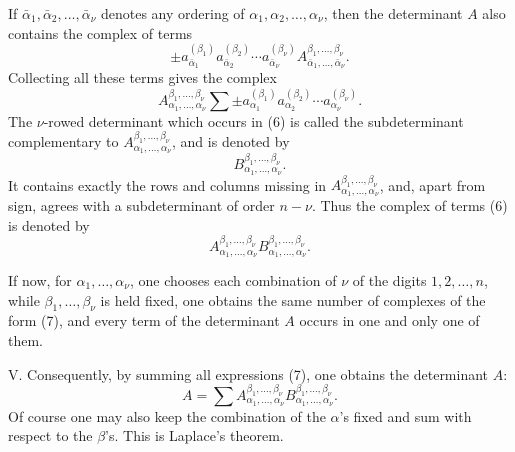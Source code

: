 \documentclass[11pt]{article}
\begin{document}
If \(\bar\alpha_1,\bar\alpha_2,\ldots,\bar\alpha_\nu\) denotes any ordering of \(\alpha_1,\alpha_2,\ldots,\alpha_\nu\), then the determinant \(A\) also contains the complex of terms
\[
        \pm a_{\bar\alpha_1}^{(\beta_1)}a_{\bar\alpha_2}^{(\beta_2)}\cdots
        a_{\bar\alpha_\nu}^{(\beta_\nu)}
        A_{\bar\alpha_1,\ldots,\bar\alpha_\nu}^{\beta_1,\ldots,\beta_\nu}.
\]
Collecting all these terms gives the complex
\begin{equation}
        A_{\alpha_1,\ldots,\alpha_\nu}^{\beta_1,\ldots,\beta_\nu}
        \sum \pm a_{\alpha_1}^{(\beta_1)}a_{\alpha_2}^{(\beta_2)}\cdots
        a_{\alpha_\nu}^{(\beta_\nu)}.
\tag{6}
\end{equation}
The \(\nu\)-rowed determinant which occurs in (6) is called the subdeterminant complementary to
\(A_{\alpha_1,\ldots,\alpha_\nu}^{\beta_1,\ldots,\beta_\nu}\), and is denoted by
\[
        B_{\alpha_1,\ldots,\alpha_\nu}^{\beta_1,\ldots,\beta_\nu}.
\]
It contains exactly the rows and columns missing in \(A_{\alpha_1,\ldots,\alpha_\nu}^{\beta_1,\ldots,\beta_\nu}\), and, apart from sign, agrees with a subdeterminant of order \(n-\nu\).  Thus the complex of terms (6) is denoted by
\begin{equation}
        A_{\alpha_1,\ldots,\alpha_\nu}^{\beta_1,\ldots,\beta_\nu}
        B_{\alpha_1,\ldots,\alpha_\nu}^{\beta_1,\ldots,\beta_\nu}.
\tag{7}
\end{equation}

If now, for \(\alpha_1,\ldots,\alpha_\nu\), one chooses each combination of \(\nu\) of the digits \(1,2,
\ldots,n\), while \(\beta_1,\ldots,\beta_\nu\) is held fixed, one obtains the same number of complexes of the form (7), and every term of the determinant \(A\) occurs in one and only one of them.

V. Consequently, by summing all expressions (7), one obtains the determinant \(A\):
\begin{equation}
        A=\sum
        A_{\alpha_1,\ldots,\alpha_\nu}^{\beta_1,\ldots,\beta_\nu}
        B_{\alpha_1,\ldots,\alpha_\nu}^{\beta_1,\ldots,\beta_\nu}.
\tag{8}
\end{equation}
Of course one may also keep the combination of the \(\alpha\)'s fixed and sum with respect to the \(\beta\)'s.  This is Laplace's theorem.
\end{document}

